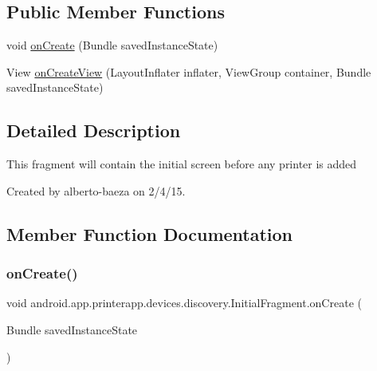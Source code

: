 \subsection*{Public Member Functions}
\begin{DoxyCompactItemize}
\item 
void \hyperlink{classandroid_1_1app_1_1printerapp_1_1devices_1_1discovery_1_1_initial_fragment_aa40401eaa83090202a9f687b7d2d79e5}{on\+Create} (Bundle saved\+Instance\+State)
\item 
View \hyperlink{classandroid_1_1app_1_1printerapp_1_1devices_1_1discovery_1_1_initial_fragment_ac84bedab28e9098fe08620d8f7fa9a14}{on\+Create\+View} (Layout\+Inflater inflater, View\+Group container, Bundle saved\+Instance\+State)
\end{DoxyCompactItemize}


\subsection{Detailed Description}
This fragment will contain the initial screen before any printer is added

Created by alberto-\/baeza on 2/4/15. 

\subsection{Member Function Documentation}
\mbox{\label{classandroid_1_1app_1_1printerapp_1_1devices_1_1discovery_1_1_initial_fragment_aa40401eaa83090202a9f687b7d2d79e5}} 
\subsubsection{\texorpdfstring{on\+Create()}{onCreate()}}
{\footnotesize\ttfamily void android.\+app.\+printerapp.\+devices.\+discovery.\+Initial\+Fragment.\+on\+Create (\begin{DoxyParamCaption}\item[{Bundle}]{saved\+Instance\+State }\end{DoxyParamCaption})}

